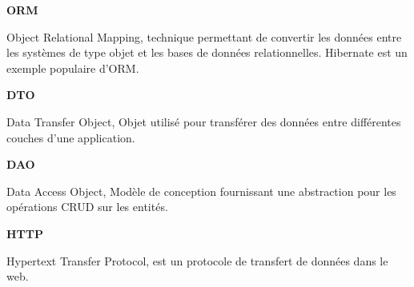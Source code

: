 \vspace{1cm}

\begin{minipage}{\textwidth}
    \begin{minipage}{0.1\textwidth}
        \textbf{ORM}
    \end{minipage}\hfill
    \begin{minipage}{0.8\textwidth}
        Object Relational Mapping, technique permettant de convertir les données entre les systèmes de type objet et les bases de données relationnelles. Hibernate est un exemple populaire d’ORM.    
    \end{minipage}
\end{minipage}

\vspace{1cm}

\begin{minipage}{\textwidth}
    \begin{minipage}{0.1\textwidth}
        \textbf{DTO}
    \end{minipage}\hfill
    \begin{minipage}{0.8\textwidth}
        Data Transfer Object, Objet utilisé pour transférer des données entre différentes couches d’une application.
    \end{minipage}
\end{minipage}

\vspace{1cm}

\begin{minipage}{\textwidth}
    \begin{minipage}{0.1\textwidth}
        \textbf{DAO}
    \end{minipage}\hfill
    \begin{minipage}{0.8\textwidth}
        Data Access Object, Modèle de conception fournissant une abstraction pour les opérations CRUD sur les entités.    
    \end{minipage}
\end{minipage}

\vspace{1cm}

\begin{minipage}{\textwidth}
    \begin{minipage}{0.1\textwidth}
        \textbf{HTTP}
    \end{minipage}\hfill
    \begin{minipage}{0.8\textwidth}
        Hypertext Transfer Protocol, est un protocole de transfert de données dans le web. 
    \end{minipage}
\end{minipage}

